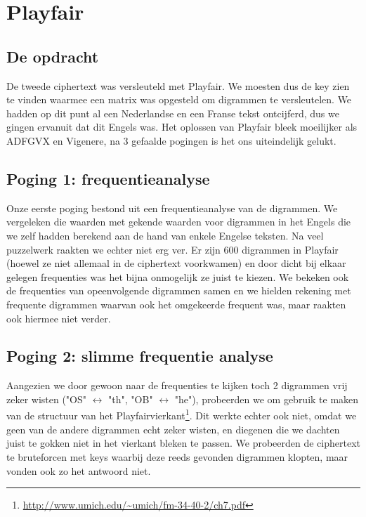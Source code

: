 
\section{Playfair}
\subsection{De opdracht}
De tweede ciphertext was versleuteld met Playfair. We moesten dus de key zien te vinden waarmee een matrix was opgesteld om digrammen te versleutelen. We hadden op dit punt al een Nederlandse en een Franse tekst ontcijferd, dus we gingen ervanuit dat dit Engels was. 
Het oplossen van Playfair bleek moeilijker als ADFGVX en Vigenere, na 3 gefaalde pogingen is het ons uiteindelijk gelukt.

\subsection{Poging 1: frequentieanalyse}
Onze eerste poging bestond uit een frequentieanalyse van de digrammen. We vergeleken die waarden met gekende waarden voor digrammen in het Engels die we zelf hadden berekend aan de hand van enkele Engelse teksten. Na veel puzzelwerk raakten we echter niet erg ver. Er zijn 600 digrammen in Playfair (hoewel ze niet allemaal in de ciphertext voorkwamen) en door dicht bij elkaar gelegen frequenties was het bijna onmogelijk ze juist te kiezen. We bekeken ook de frequenties van opeenvolgende digrammen samen en we hielden rekening met frequente digrammen waarvan ook het omgekeerde frequent was, maar raakten ook hiermee niet verder.

\subsection{Poging 2: slimme frequentie analyse}
Aangezien we door gewoon naar de frequenties te kijken toch 2 digrammen vrij zeker wisten ("OS" $\leftrightarrow$ "th", "OB" $\leftrightarrow$ "he"), probeerden we om gebruik te maken van de structuur van het Playfairvierkant\footnote{\url{http://www.umich.edu/~umich/fm-34-40-2/ch7.pdf}}. Dit werkte echter ook niet, omdat we geen van de andere digrammen echt zeker wisten, en diegenen die we dachten juist te gokken niet in het vierkant bleken te passen. We probeerden de ciphertext te bruteforcen met keys waarbij deze reeds gevonden digrammen klopten, maar vonden ook zo het antwoord niet.
 
